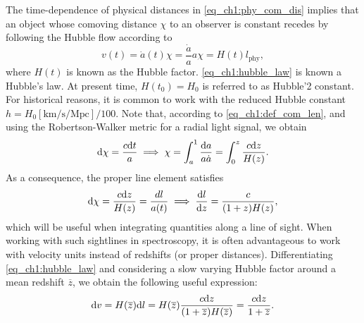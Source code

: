 The time-dependence of physical distances in \cref{eq_ch1:phy_com_dis} implies that an object whose comoving distance $\chi$ to an observer is constant recedes by following the Hubble flow according to
\begin{equation}\label{eq_ch1:hubble_law}
    v(t)=\dot{a}(t)\chi=\frac{\dot{a}}{a}a\chi=H(t)l_\text{phy},
\end{equation}
where $H(t)$ is known as the Hubble factor. \cref{eq_ch1:hubble_law} is known a Hubble's law. At present time, $H(t_0)=H_0$ is referred to as Hubble'2 constant. For historical reasons, it is common to work with the reduced Hubble constant $h=H_0 [\text{km/s/Mpc}]/100$.
Note that, according to \cref{eq_ch1:def_com_len}, and using the Robertson-Walker metric for a radial light signal, we obtain
\begin{equation}
    \differential \chi=\frac{c\differential t}{a}\implies \chi=\int_a^1\frac{\differential a}{a \dot{a}}=\int_0^z\frac{c \differential z}{H(z)}.
\end{equation}
As a consequence, the proper line element satisfies
\begin{equation}\label{eq_ch1:dl_over_dz}
    \differential \chi =\frac{c\differential z}{H(z)}=\frac{dl}{a(t)} \implies \frac{\differential l}{\differential z}=\frac{c}{(1+z)H(z)},
\end{equation}
which will be useful when integrating quantities along a line of sight. When working with such sightlines in spectroscopy, it is often advantageous to work with velocity units instead of redshifts (or proper distances). Differentiating \cref{eq_ch1:hubble_law} and considering a slow varying Hubble factor around a mean redshift $\overline{z}$, we obtain the following useful expression:
\begin{equation}
    \differential v=H(\overline{z})\differential l=H(\overline{z})\frac{c\differential z}{(1+\overline{z})H(\overline{z})}=\frac{c\differential z}{1+\overline{z}}.
\end{equation}

